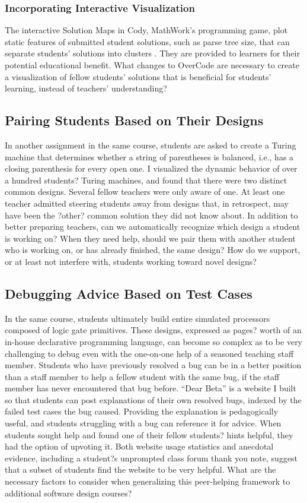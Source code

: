 \documentclass{sigchi}
\begin{document}
\subsubsection{Incorporating Interactive Visualization}
The interactive Solution Maps in Cody, MathWork's programming game, plot static features of submitted student solutions, such as parse tree size, that can separate students' solutions into clusters \cite{Cody}. They are provided to learners for their potential educational benefit. What changes to OverCode are necessary to create a visualization of fellow students' solutions that is beneficial for students' learning, instead of teachers' understanding?

\subsection{Pairing Students Based on Their Designs} In another assignment in the same course, students are asked to create a Turing machine that determines whether a string of parentheses is balanced, i.e., has a closing parenthesis for every open one. I visualized the dynamic behavior of over a hundred students? Turing machines, and found that there were two distinct common designs. Several fellow teachers were only aware of one. At least one teacher admitted steering students away from designs that, in retrospect, may have been the ?other? common solution they did not know about. In addition to better preparing teachers, can we automatically recognize which design a student is working on? When they need help, should we pair them with another student who is working on, or has already finished, the same design? How do we support, or at least not interfere with, students working toward novel designs?

\subsection{Debugging Advice Based on Test Cases} In the same course, students ultimately build entire simulated processors composed of logic gate primitives. These designs, expressed as pages? worth of an in-house declarative programming language, can become so complex as to be very challenging to debug even with the one-on-one help of a seasoned teaching staff member. Students who have previously resolved a bug can be in a better position than a staff member to help a fellow student with the same bug, if the staff member has never encountered that bug before. 
``Dear Beta'' is a website I built so that students can post explanations of their own resolved bugs, indexed by the failed test cases the bug caused. Providing the explanation is pedagogically useful, and students struggling with a bug can reference it for advice. When students sought help and found one of their fellow students? hints helpful, they had the option of upvoting it. Both website usage statistics and anecdotal evidence, including a student?s unprompted class forum thank you note, suggest that a subset of students find the website to be very helpful. What are the necessary factors to consider when generalizing this peer-helping framework to additional software design courses?
\end{document}
